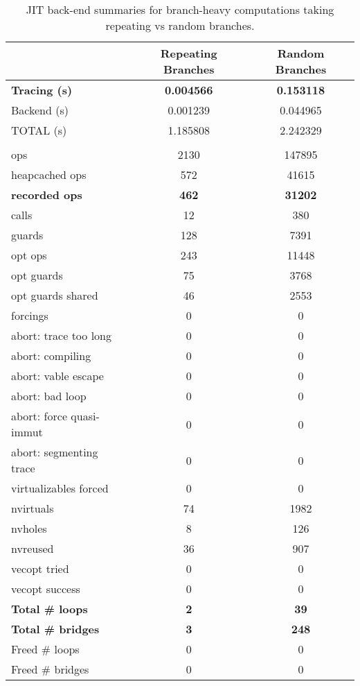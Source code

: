 			\begin{table}[!h]
			\centering
			\small
			\begin{tabular}{@{}lcc@{}}
				\toprule
				& \textbf{Repeating Branches} & \textbf{Random Branches} \\
				\midrule
				\textbf{Tracing (s)}                 & \textbf{0.004566} & \textbf{0.153118} \\
				Backend (s)                 & 0.001239 & 0.044965 \\
				TOTAL (s)                            & 1.185808 & 2.242329 \\ \\
				ops                                   & 2130 & 147895 \\
				heapcached ops                        & 572 & 41615 \\
				\textbf{recorded ops}                & \textbf{462} & \textbf{31202} \\
				\quad calls                                 & 12 & 380 \\
				guards                                & 128 & 7391 \\
				opt ops                               & 243 & 11448 \\
				opt guards                            & 75 & 3768 \\
				opt guards shared                     & 46 & 2553 \\
				forcings                              & 0 & 0 \\
				abort: trace too long                 & 0 & 0 \\
				abort: compiling                      & 0 & 0 \\
				abort: vable escape                   & 0 & 0 \\
				abort: bad loop                       & 0 & 0 \\
				abort: force quasi-immut              & 0 & 0 \\
				abort: segmenting trace               & 0 & 0 \\
				virtualizables forced                 & 0 & 0 \\
				nvirtuals                    & 74 & 1982 \\
				nvholes                               & 8 & 126 \\
				nvreused                              & 36 & 907 \\
				vecopt tried                          & 0 & 0 \\
				vecopt success                        & 0 & 0 \\
				\textbf{Total \# loops}               & \textbf{2} & \textbf{39} \\
				\textbf{Total \# bridges}             & \textbf{3} & \textbf{248} \\
				Freed \# loops                        & 0 & 0 \\
				Freed \# bridges                      & 0 & 0 \\
				\bottomrule
			\end{tabular}
			\caption{JIT back-end summaries for branch-heavy computations taking repeating vs random branches.}
			\label{table:branchy-backend-summaries}
			\end{table}


